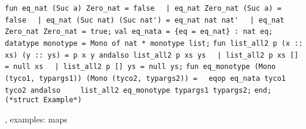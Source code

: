 \begin{isabellebody}
\begin{isamarkuptext}
\newline%
\verb|fun eq_nat (Suc a) Zero_nat = false|\newline%
\verb|  |\verb,|,\verb| eq_nat Zero_nat (Suc a) = false|\newline%
\verb|  |\verb,|,\verb| eq_nat (Suc nat) (Suc nat') = eq_nat nat nat'|\newline%
\verb|  |\verb,|,\verb| eq_nat Zero_nat Zero_nat = true;|\newline%
\newline%
\verb|val eq_nata = {eq = eq_nat} : nat eq;|\newline%
\newline%
\verb|datatype monotype = Mono of nat * monotype list;|\newline%
\newline%
\verb|fun list_all2 p (x :: xs) (y :: ys) = p x y andalso list_all2 p xs ys|\newline%
\verb|  |\verb,|,\verb| list_all2 p xs [] = null xs|\newline%
\verb|  |\verb,|,\verb| list_all2 p [] ys = null ys;|\newline%
\newline%
\verb|fun eq_monotype (Mono (tyco1, typargs1)) (Mono (tyco2, typargs2)) =|\newline%
\verb|  eqop eq_nata tyco1 tyco2 andalso|\newline%
\verb|    list_all2 eq_monotype typargs1 typargs2;|\newline%
\newline%
\verb|end; (*struct Example*)|%
\end{isamarkuptext}%
\isamarkuptrue%
%
\endisatagquoteme
{\isafoldquoteme}%
%
\isadelimquoteme
%
\endisadelimquoteme
%
\isamarkuptrue%
%
\begin{isamarkuptext}%
\hyperlink{command.code-abort}{\mbox{}}, examples: maps%
\end{isamarkuptext}%
\isamarkuptrue%
%
\isadelimtheory
%
\endisadelimtheory
%
\isatagtheory
{}\isamarkupfalse%
%
\endisatagtheory
{\isafoldtheory}%
%
\isadelimtheory
%
\endisadelimtheory
\isanewline
\end{isabellebody}%
